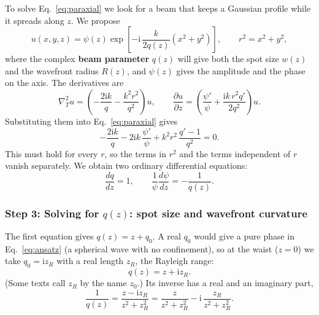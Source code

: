 \documentclass[11pt,a4paper]{article}
\begin{document}
	To solve Eq.~\eqref{eq:paraxial} we look for a beam that keeps a Gaussian profile while it spreads along $z$. We propose
	\begin{equation}
		u(x,y,z)=\psi(z)\exp\!\left[-\mathrm{i}\,\frac{k}{2q(z)}\left(x^2+y^2\right)\right],\qquad r^2=x^2+y^2,
		\label{eq:ansatz}
	\end{equation}
	where the complex \textbf{beam parameter} $q(z)$ will give both the spot size $w(z)$ and the wavefront radius $R(z)$, and $\psi(z)$ gives the amplitude and the phase on the axis. The derivatives are
	\begin{equation}
		\nabla_T^2u=\left(-\frac{2\mathrm{i}k}{q}-\frac{k^2r^2}{q^2}\right)u,\qquad
		\frac{\partial u}{\partial z}=\left(\frac{\psi'}{\psi}+\frac{\mathrm{i}k\,r^2q'}{2q^2}\right)u .
	\end{equation}
	Substituting them into Eq.~\eqref{eq:paraxial} gives
	\begin{equation}
		-\frac{2\mathrm{i}k}{q}-2\mathrm{i}k\,\frac{\psi'}{\psi}+k^2r^2\,\frac{q'-1}{q^2}=0 .
	\end{equation}
	This must hold for every $r$, so the terms in $r^2$ and the terms independent of $r$ vanish separately. We obtain two ordinary differential equations:
	\begin{equation}
		\frac{dq}{dz}=1,\qquad \frac{1}{\psi}\frac{d\psi}{dz}=-\frac{1}{q(z)} .
		\label{eq:qpsi}
	\end{equation}
	
	\subsubsection*{Step 3: Solving for $q(z)$: spot size and wavefront curvature}
	
	The first equation gives $q(z)=z+q_0$. A real $q_0$ would give a pure phase in Eq.~\eqref{eq:ansatz} (a spherical wave with no confinement), so at the waist ($z=0$) we take $q_0=\mathrm{i}z_R$ with a real length $z_R$, the Rayleigh range:
	\begin{equation}
		q(z)=z+\mathrm{i}z_R .
	\end{equation}
	(Some texts call $z_R$ by the name $z_0$.) Its inverse has a real and an imaginary part,
	\begin{equation}
		\frac{1}{q(z)}=\frac{z-\mathrm{i}z_R}{z^2+z_R^2}=\frac{z}{z^2+z_R^2}-\mathrm{i}\,\frac{z_R}{z^2+z_R^2}.
	\end{equation}
\end{document}
